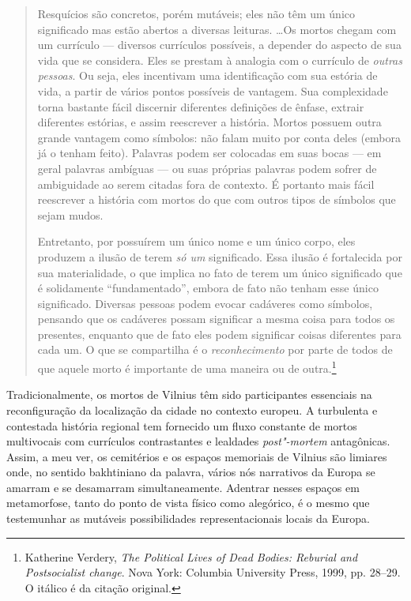 \begin{quote}
Resquícios são concretos, porém mutáveis; eles não têm um único
significado mas estão abertos a diversas leituras. \ldots{}Os mortos chegam
com um currículo --- diversos currículos possíveis, a depender do aspecto
de sua vida que se considera. Eles se prestam à analogia com o currículo
de \textit{outras pessoas}. Ou seja, eles incentivam uma identificação com
sua estória de vida, a partir de vários pontos possíveis de vantagem.
Sua complexidade torna bastante fácil discernir diferentes definições de
ênfase, extrair diferentes estórias, e assim reescrever a história.
Mortos possuem outra grande vantagem como símbolos: não falam muito por
conta deles (embora já o tenham feito). Palavras podem ser colocadas em
suas bocas --- em geral palavras ambíguas --- ou suas próprias palavras
podem sofrer de ambiguidade ao serem citadas fora de contexto. É
portanto mais fácil reescrever a história com mortos do que com outros
tipos de símbolos que sejam mudos.

Entretanto, por possuírem um único nome e um único corpo, eles produzem
a ilusão de terem \textit{só um} significado. Essa ilusão é fortalecida
por sua materialidade, o que implica no fato de terem um único
significado que é solidamente ``fundamentado'', embora de fato não
tenham esse único significado. Diversas pessoas podem evocar cadáveres
como símbolos, pensando que os cadáveres possam significar a mesma coisa
para todos os presentes, enquanto que de fato eles podem significar
coisas diferentes para cada um. O que se compartilha é o
\textit{reconhecimento} por parte de todos de que aquele morto é
importante de uma maneira ou de outra.\footnote{Katherine Verdery, \textit{The Political Lives of Dead Bodies: Reburial and Postsocialist change}. Nova York: Columbia University Press, 1999, pp. 28--29. O itálico é da citação original.} 
\end{quote}

Tradicionalmente, os mortos de Vilnius têm sido participantes essenciais
na reconfiguração da localização da cidade no contexto europeu. A
turbulenta e contestada história regional tem fornecido um fluxo
constante de mortos multivocais com currículos contrastantes e lealdades
\textit{post"-mortem} antagônicas. Assim, a meu ver, os cemitérios e os
espaços memoriais de Vilnius são limiares onde, no sentido bakhtiniano
da palavra, vários nós narrativos da Europa se amarram e se desamarram
simultaneamente. Adentrar nesses espaços em metamorfose, tanto do ponto
de vista físico como alegórico, é o mesmo que testemunhar as mutáveis
possibilidades representacionais locais da Europa.

